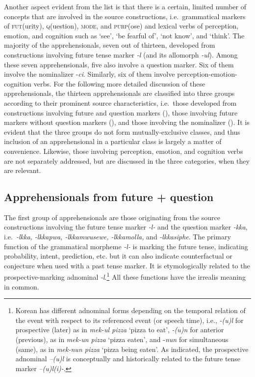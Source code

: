 \documentclass[output=paper,colorlinks,citecolor=brown]{langscibook}
\begin{document}
Another aspect evident from the list is that there is a certain, limited number of concepts that are involved in the source constructions, i.e.\  grammatical markers of \textsc{fut}(urity), \textsc{q}(uestion), \textsc{mode}, and \textsc{purp}(ose) and lexical verbs of perception, emotion, and cognition such as `see', `be fearful of', `not know', and `think'. The majority of the apprehensionals, seven out of thirteen, developed from constructions involving future tense marker \textit{-l} (and its allomorph \textit{-ul}). Among these seven apprehensionals, five also involve a question marker. Six of them involve the nominalizer \nobreakdash-\textit{ci}. Similarly, six of them involve perception-emotion-cognition verbs. For the following more detailed discussion of these apprehensionals, the thirteen apprehensionals are classified into three groups according to their prominent source characteristics, i.e.\  those developed from constructions involving future and question markers (), those involving future markers without question markers (), and those involving the nominalizer (). It is evident that the three groups do not form mutually-exclusive classes, and thus inclusion of an apprehensional in a particular class is largely a matter of convenience. Likewise, those involving perception, emotion, and cognition verbs are not separately addressed, but are discussed in the three categories, when they are relevant.



\subsection{Apprehensionals from future + question}
\label{subsec:futurequestion}
\largerpage

The first group of apprehensionals are those originating from the source constructions involving the future tense marker \textit{-l-} and the question marker \textit{-kka}, i.e.\  \textit{-lkka, -lkkapwa, -lkkamwusewe, -lkkamolla,} and \textit{-lkkasiphe}. The primary function of the grammatical morpheme \textit{-l-} is marking the future tense, indicating probability, intent, prediction, etc. but it can also indicate counterfactual or conjecture when used with a past tense marker. It is etymologically related to the prospective-marking adnominal \textit{-l}.\footnote{Korean has different adnominal forms depending on the temporal relation of the event with respect to its referenced event (or speech time), i.e., \textit{-(u)l} for prospective (later) as in \textit{mek-ul pizza} `pizza to eat', \textit{-(u)n} for anterior (previous), as in \textit{mek-un pizza} `pizza eaten', and \nobreakdash-\textit{nun} for simultaneous (same), as in \textit{mek-nun pizza} `pizza being eaten'. As indicated, the prospective adnominal \textit{–(u)l} is conceptually and historically related to the future tense marker \textit{–(u)l(i)-}.} All these functions have the irrealis meaning in common.
\end{document}

